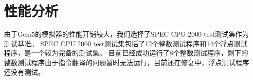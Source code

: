 






\section{性能分析}
由于Gem5的模拟器的性能开销较大，我们选择了SPEC CPU 2000 test测试集作为测试基准。
SPEC CPU 2000 test测试集包括了12个整数测试程序和14个浮点测试程序，是一个较为完备的测试集。
目前已经成功运行了8个整数测试程序，剩下的整数测试程序由于指令翻译的问题暂时无法运行，目前还在修复中，浮点测试程序还没有测试。

